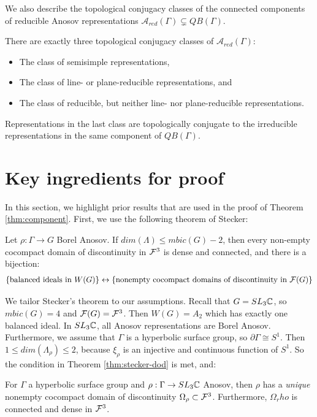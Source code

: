 We also describe the topological conjugacy classes of the connected components of 
reducible Anosov representations $\mathcal{A}_{red}(\Gamma) \subsetneq QB(\Gamma)$.
\begin{theorem}\label{thm:reducible}
    There are exactly three topological conjugacy classes of $\mathcal{A}_{red}(\Gamma)$:
    \begin{itemize}
        \item The class of semisimple representations,
        \item The class of line- or plane-reducible representations, and
        \item The class of reducible, but neither line- nor plane-reducible representations. 
    \end{itemize}
    Representations in the last class are topologically conjugate 
    to the irreducible representations in the same component of $QB(\Gamma)$.
\end{theorem}

\section{Key ingredients for proof}

In this section, we highlight prior results that are 
used in the proof of Theorem \ref{thm:component}.
First, we use the following theorem of Stecker:
\begin{theorem}\label{thm:stecker-dod}
    Let $\rho:\Gamma \rightarrow G$ Borel Anosov. 
    If $dim(\Lambda) \leq mbic(G) - 2$, then every non-empty 
    cocompact domain of discontinuity in $\mathcal{F}^3$ is dense and connected,
    and there is a bijection:
    \begin{align}
        \{ \text{balanced ideals in } W(G)\} \leftrightarrow \{\text{nonempty cocompact domains of discontinuity in }\mathcal{F}(G)\}
    \end{align}
\end{theorem}

We tailor Stecker's theorem to our assumptions.
Recall that $G=SL_3\mathbb{C}$, so $mbic(G)=4$ and $\mathcal{F}(G) = \mathcal{F}^3$.
Then $W(G) = A_2$ which has exactly one balanced ideal. 
In $SL_3\mathbb{C}$, all Anosov representations are Borel Anosov.
Furthermore, we assume that $\Gamma$ is a hyperbolic surface group, so $\partial \Gamma \cong S^1$.
Then $1 \leq dim(\Lambda_\rho) \leq 2$, 
because $\xi_\rho$ is an injective and continuous function of $S^1$.
So the condition in Theorem \ref{thm:stecker-dod} is met, and:
\begin{remark}
    For $\Gamma$ a hyperbolic surface group and $\rho:\Gamma \rightarrow SL_3\mathbb{C}$ Anosov,
    then $\rho$ has a \emph{unique} nonempty cocompact domain of discontinuity $\Omega_\rho \subset \mathcal{F}^3$.
    Furthermore, $\Omega_rho$ is connected and dense in $\mathcal{F}^3$.
\end{remark}


